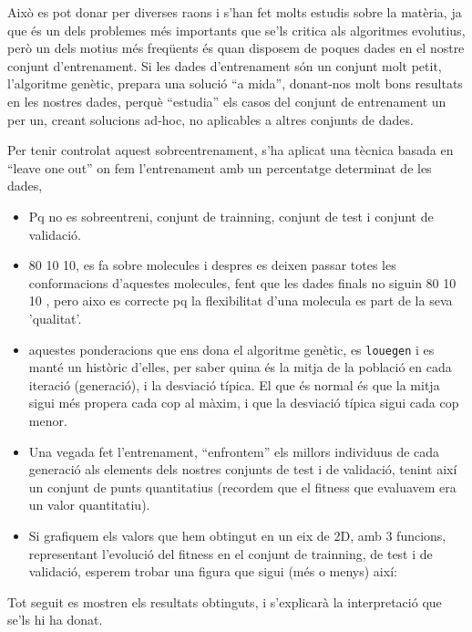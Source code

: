 \documentclass[titlepage,a4paper,12pt]{book}
\begin{document}
Això es pot donar per diverses raons i s'han fet molts estudis sobre la
matèria, ja que és un dels problemes més importants que se'ls critica als
algoritmes evolutius, però un dels motius més freqüents és quan
disposem de poques dades en el nostre conjunt d'entrenament.  Si les dades
d'entrenament són un conjunt molt petit, l'algoritme genètic, prepara una
solució ``a mida'', donant-nos molt bons resultats en les nostres dades, perquè
``estudia'' els casos del conjunt de entrenament un per un, creant solucions
ad-hoc, no aplicables a altres conjunts de dades.

Per tenir controlat aquest sobreentrenament, s'ha aplicat una tècnica basada en
``leave one out'' on fem l'entrenament amb un percentatge determinat de les
dades, 

\begin{itemize}
	\item Pq no es sobreentreni, conjunt de trainning, conjunt de test i conjunt
		de validació.
	\item 80 10 10, es fa sobre molecules i despres es deixen passar totes les
		conformacions d'aquestes molecules, fent que les dades finals no siguin 80 10 10
		, pero aixo es correcte pq la flexibilitat d'una molecula es part de la seva
		'qualitat'.
	\item aquestes ponderacions que ens dona el algoritme genètic, es
		\texttt{louegen} i es manté un històric d'elles, per saber quina és la mitja
		de la població en cada iteració (generació), i la desviació típica.  El que
		és normal és que la mitja sigui més propera cada cop al màxim, i que la
		desviació típica sigui cada cop menor.
	\item Una vegada fet l'entrenament, ``enfrontem'' els millors individuus de
	cada generació als elements dels nostres conjunts de test i de validació,
	tenint així un conjunt de punts quantitatius (recordem que el fitness que
	evaluavem era un valor quantitatiu).
	\item Si grafiquem els valors que hem obtingut en un eix de 2D, amb 3
	funcions, representant l'evolució del fitness en el conjunt de trainning, de
	test i de validació, esperem trobar una figura que sigui (més o menys) així:
\end{itemize}
 
Tot seguit es mostren els resultats obtinguts, i s'explicarà la interpretació
que se'ls hi ha donat.


\end{document}
